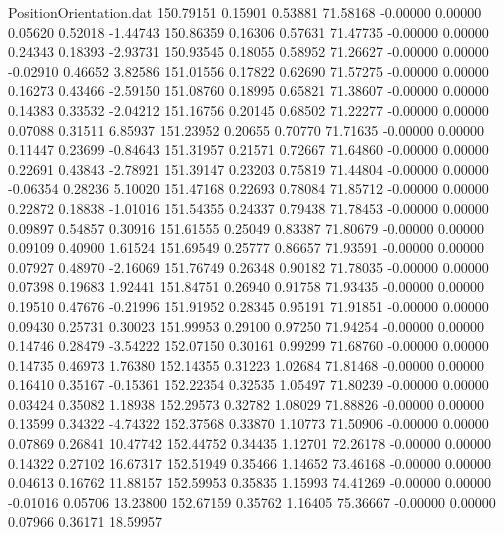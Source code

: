 \begin{filecontents}{PositionOrientation.dat}
 150.79151    0.15901    0.53881    71.58168   -0.00000    0.00000    0.05620    0.52018   -1.44743
 150.86359    0.16306    0.57631    71.47735   -0.00000    0.00000    0.24343    0.18393   -2.93731
 150.93545    0.18055    0.58952    71.26627   -0.00000    0.00000   -0.02910    0.46652    3.82586
 151.01556    0.17822    0.62690    71.57275   -0.00000    0.00000    0.16273    0.43466   -2.59150
 151.08760    0.18995    0.65821    71.38607   -0.00000    0.00000    0.14383    0.33532   -2.04212
 151.16756    0.20145    0.68502    71.22277   -0.00000    0.00000    0.07088    0.31511    6.85937
 151.23952    0.20655    0.70770    71.71635   -0.00000    0.00000    0.11447    0.23699   -0.84643
 151.31957    0.21571    0.72667    71.64860   -0.00000    0.00000    0.22691    0.43843   -2.78921
 151.39147    0.23203    0.75819    71.44804   -0.00000    0.00000   -0.06354    0.28236    5.10020
 151.47168    0.22693    0.78084    71.85712   -0.00000    0.00000    0.22872    0.18838   -1.01016
 151.54355    0.24337    0.79438    71.78453   -0.00000    0.00000    0.09897    0.54857    0.30916
 151.61555    0.25049    0.83387    71.80679   -0.00000    0.00000    0.09109    0.40900    1.61524
 151.69549    0.25777    0.86657    71.93591   -0.00000    0.00000    0.07927    0.48970   -2.16069
 151.76749    0.26348    0.90182    71.78035   -0.00000    0.00000    0.07398    0.19683    1.92441
 151.84751    0.26940    0.91758    71.93435   -0.00000    0.00000    0.19510    0.47676   -0.21996
 151.91952    0.28345    0.95191    71.91851   -0.00000    0.00000    0.09430    0.25731    0.30023
 151.99953    0.29100    0.97250    71.94254   -0.00000    0.00000    0.14746    0.28479   -3.54222
 152.07150    0.30161    0.99299    71.68760   -0.00000    0.00000    0.14735    0.46973    1.76380
 152.14355    0.31223    1.02684    71.81468   -0.00000    0.00000    0.16410    0.35167   -0.15361
 152.22354    0.32535    1.05497    71.80239   -0.00000    0.00000    0.03424    0.35082    1.18938
 152.29573    0.32782    1.08029    71.88826   -0.00000    0.00000    0.13599    0.34322   -4.74322
 152.37568    0.33870    1.10773    71.50906   -0.00000    0.00000    0.07869    0.26841   10.47742
 152.44752    0.34435    1.12701    72.26178   -0.00000    0.00000    0.14322    0.27102   16.67317
 152.51949    0.35466    1.14652    73.46168   -0.00000    0.00000    0.04613    0.16762   11.88157
 152.59953    0.35835    1.15993    74.41269   -0.00000    0.00000   -0.01016    0.05706   13.23800
 152.67159    0.35762    1.16405    75.36667   -0.00000    0.00000    0.07966    0.36171   18.59957

\end{filecontents}
